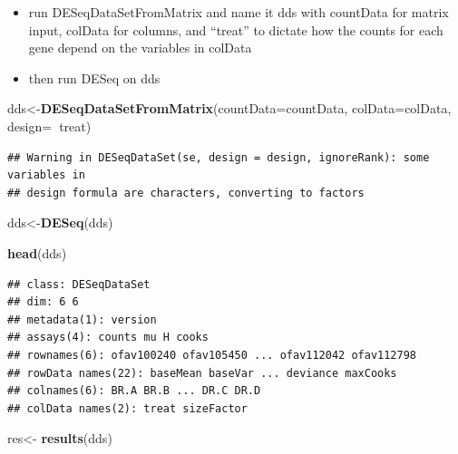 \documentclass[
]{article}
\newenvironment{Shaded}{\begin{snugshade}}{\end{snugshade}}
\newcommand{\DataTypeTok}[1]{\textcolor[rgb]{0.13,0.29,0.53}{#1}}
\newcommand{\KeywordTok}[1]{\textcolor[rgb]{0.13,0.29,0.53}{\textbf{#1}}}
\newcommand{\NormalTok}[1]{#1}
\newcommand{\OperatorTok}[1]{\textcolor[rgb]{0.81,0.36,0.00}{\textbf{#1}}}
\newcommand{\StringTok}[1]{\textcolor[rgb]{0.31,0.60,0.02}{#1}}
\providecommand{\tightlist}{%
  \setlength{\itemsep}{0pt}\setlength{\parskip}{0pt}}
\begin{document}
\begin{itemize}
\tightlist
\item
  run DESeqDataSetFromMatrix and name it dds with countData for matrix
  input, colData for columns, and ``treat'' to dictate how the counts
  for each gene depend on the variables in colData
\item
  then run DESeq on dds
\end{itemize}

\begin{Shaded}
\begin{Highlighting}[]
\NormalTok{dds<-}\KeywordTok{DESeqDataSetFromMatrix}\NormalTok{(}\DataTypeTok{countData=}\NormalTok{countData, }\DataTypeTok{colData=}\NormalTok{colData, }\DataTypeTok{design=}\OperatorTok{~}\NormalTok{treat)}
\end{Highlighting}
\end{Shaded}

\begin{verbatim}
## Warning in DESeqDataSet(se, design = design, ignoreRank): some variables in
## design formula are characters, converting to factors
\end{verbatim}

\begin{Shaded}
\begin{Highlighting}[]
\NormalTok{dds<-}\KeywordTok{DESeq}\NormalTok{(dds)}
\end{Highlighting}
\end{Shaded}

\begin{Shaded}
\begin{Highlighting}[]
\KeywordTok{head}\NormalTok{(dds)}
\end{Highlighting}
\end{Shaded}

\begin{verbatim}
## class: DESeqDataSet 
## dim: 6 6 
## metadata(1): version
## assays(4): counts mu H cooks
## rownames(6): ofav100240 ofav105450 ... ofav112042 ofav112798
## rowData names(22): baseMean baseVar ... deviance maxCooks
## colnames(6): BR.A BR.B ... DR.C DR.D
## colData names(2): treat sizeFactor
\end{verbatim}

\begin{Shaded}
\begin{Highlighting}[]
\NormalTok{res<-}\StringTok{ }\KeywordTok{results}\NormalTok{(dds)}
\end{Highlighting}
\end{Shaded}
\end{document}
